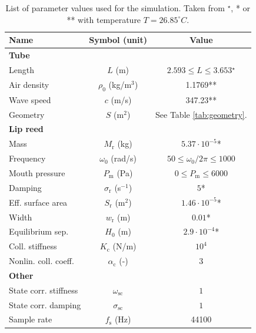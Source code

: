 

\begin{table}[t]
    \small
    \begin{center}
    \begin{tabular}{|l|c|c|}
        \hline
        Name & Symbol (unit) & Value\\ \hline
        \multicolumn{3}{|l|}{\bf Tube}\\ \hline
        Length & $L$ (m) & $2.593\leq L \leq 3.653$$^\star$\\
        Air density &$\rho_0$ (kg/m$^3$) & 1.1769** 
        \\
        Wave speed & $c$ (m/s) & 347.23**\\
        Geometry & $S$ (m$^2$) & See Table \ref{tab:geometry}. \\\hline
        \multicolumn{3}{|l|}{\bf Lip reed}\\ \hline
        Mass & $M_\text{r}$ (kg) & $5.37\cdot10^{-5}$*\\
        Frequency & $\omega_0$ (rad/s) & $ 50\leq \omega_0/2\pi \leq 1000$\\
        Mouth pressure & $P_\text{m}$ (Pa) & $0 \leq P_\text{m} \leq 6000$\\
        Damping & $\sigma_\text{r}$ (s$^{-1}$) & $5$*\\
        Eff. surface area & $S_\text{r}$ (m$^{2}$) & $1.46\cdot 10^{-5}$*\\
        Width & $w_\text{r}$ (m) & $0.01$* \\
        Equilibrium sep. & $H_0$ (m) &  $2.9 \cdot 10^{-4}$* \\
        Coll. stiffness& $K_\text{c}$ (N/m) & $10^4$\\
        Nonlin. coll. coeff.& $\alpha_\text{c}$ (-)  &3\\\hline
        \multicolumn{3}{|l|}{\bf Other}\\ \hline
        State corr. stiffness & $\omega_\text{sc}$ & $1$\\ 
        State corr. damping & $\sigma_\text{sc}$ & $1$\\ 
        Sample rate & $f_\text{s}$ (Hz) & 44100\\
        \hline
    \end{tabular}
    \caption{List of parameter values used for the simulation. 
    Taken from $^\star$\cite{Smyth2011}, *\cite{Harrison2018} or **\cite{Benade1968} with temperature $T=26.85^\circ C$. \label{tab:parameters}}
    \end{center}
\end{table}

